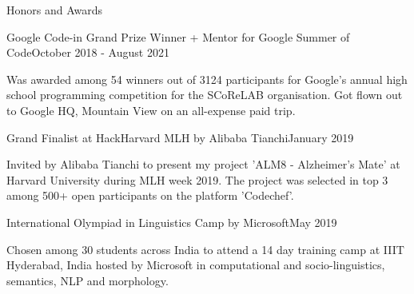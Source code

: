\documentclass[
	a4paper, %
	10pt, %
]{resume} %
\begin{document}
\begin{rSection}{Honors and Awards}

	\begin{achSubsection}{Google Code-in Grand Prize Winner + Mentor for Google Summer of Code}{October 2018 - August 2021}
		\item Was awarded among 54 winners out of 3124 participants for Google's annual high school programming competition for the SCoReLAB organisation. Got flown out to Google HQ, Mountain View on an all-expense paid trip.
	\end{achSubsection}




	\begin{achSubsection}{Grand Finalist at HackHarvard MLH by Alibaba Tianchi}{January 2019}
		\item Invited by Alibaba Tianchi to present my project 'ALM8 - Alzheimer's Mate' at Harvard University during MLH week 2019. The project was selected in top 3 among 500+ open participants on the platform 'Codechef'.
	\end{achSubsection}


	\begin{achSubsection}{International Olympiad in Linguistics Camp by Microsoft}{May 2019}
		\item Chosen among 30 students across India to attend a 14 day training camp at IIIT Hyderabad, India hosted by Microsoft in computational and socio-linguistics, semantics, NLP and morphology.
	\end{achSubsection}

\end{rSection}




\end{document}
